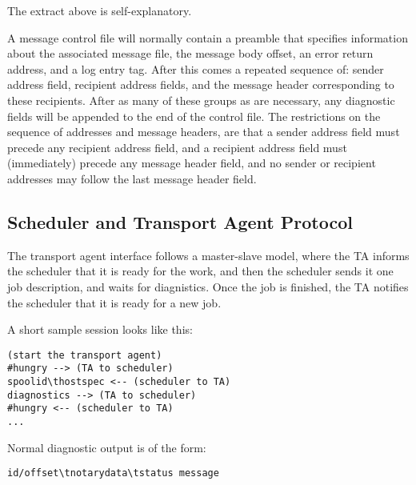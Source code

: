 The extract above is self-explanatory.

A message control file will normally contain a preamble that specifies
information about the associated message file, the message body offset, an
error return address, and a log entry tag.  After this comes a repeated
sequence of: sender address field, recipient address fields, and the
message header corresponding to these recipients.  After as many of these
groups as are necessary, any diagnostic fields will be appended to the end
of the control file.  The restrictions on the sequence of addresses and
message headers, are that a sender address field must precede any recipient
address field, and a recipient address field must (immediately) precede any
message header field, and no sender or recipient addresses may follow the
last message header field.






\subsection{Scheduler and Transport Agent Protocol}



The transport agent interface follows a master-slave model,
where  the  TA  informs the scheduler that it is ready for
the work, and then the scheduler sends it one job 
description,  and  waits  for diagnistics.  Once the job is 
finished, the TA notifies the scheduler that it is ready for
a new job.

A short sample session looks like this:
\begin{tscreen}
\begin{verbatim}
(start the transport agent)
#hungry --> (TA to scheduler)
spoolid\thostspec <-- (scheduler to TA)
diagnostics --> (TA to scheduler)
#hungry <-- (scheduler to TA)
...
\end{verbatim}
\end{tscreen}

Normal diagnostic output is of the form:
\begin{tscreen}
\begin{verbatim}
id/offset\tnotarydata\tstatus message
\end{verbatim}
\end{tscreen}

